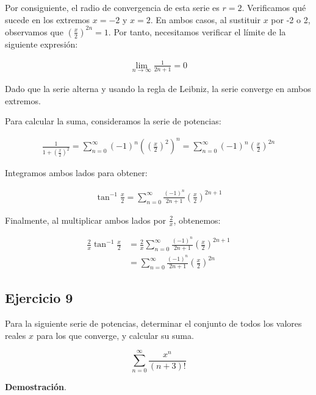 \documentclass{article}
\begin{document}
    Por consiguiente, el radio de convergencia de esta serie es \( r=2 \). Verificamos qué sucede en los extremos \( x=-2 \) y \( x=2 \). En ambos casos, al sustituir \( x \) por -2 o 2, observamos que \( \left( \frac{x}{2} \right)^{2n} = 1 \). Por tanto, necesitamos verificar el límite de la siguiente expresión:

    \begin{align*}
    \lim _{n \rightarrow \infty} \frac{1}{2 n+1}=0
    \end{align*}

    Dado que la serie alterna y usando la regla de Leibniz, la serie converge en ambos extremos.

    Para calcular la suma, consideramos la serie de potencias:

    \begin{align*}
    \frac{1}{1+\left(\frac{x}{2}\right)^{2}} = \sum_{n=0}^{\infty}(-1)^{n}\left( \left( \frac{x}{2} \right)^{2} \right)^{n}
    = \sum_{n=0}^{\infty}(-1)^{n}\left(\frac{x}{2}\right)^{2 n}
    \end{align*}

    Integramos ambos lados para obtener:

    \begin{align*}
    \tan ^{-1} \frac{x}{2} = \sum_{n=0}^{\infty} \frac{(-1)^{n}}{2 n+1} \left( \frac{x}{2} \right)^{2 n+1}
    \end{align*}

    Finalmente, al multiplicar ambos lados por \( \frac{2}{x} \), obtenemos:

    \begin{align*}
    \frac{2}{x} \tan ^{-1} \frac{x}{2}
    &= \frac{2}{x} \sum_{n=0}^{\infty} \frac{(-1)^{n}}{2 n+1} \left( \frac{x}{2} \right)^{2 n+1} \\
    &= \sum_{n=0}^{\infty} \frac{(-1)^{n}}{2 n+1} \left( \frac{x}{2} \right)^{2 n}
    \end{align*}

    \subsection*{Ejercicio 9}

    Para la siguiente serie de potencias, determinar el conjunto de todos los valores reales $x$ para los que converge, y calcular su suma.

    \[
    \sum_{n=0}^{\infty} \frac{x^{n}}{(n+3)!}
    \]

    \textbf{Demostración}.\\
\end{document}
